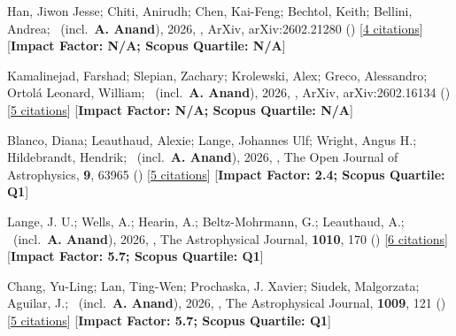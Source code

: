 \item[{\color{numcolor}\scriptsize34}] Han, Jiwon Jesse; Chiti, Anirudh; Chen, Kai-Feng; Bechtol, Keith; Bellini, Andrea; \etal\ (incl.\ \textbf{A. Anand}), 2026, , ArXiv, arXiv:2602.21280 () [\href{https://ui.adsabs.harvard.edu/abs/2026arXiv260221280H}{4 citations}] [\textbf{Impact Factor: N/A; Scopus Quartile: N/A}]

\item[{\color{numcolor}\scriptsize33}] Kamalinejad, Farshad; Slepian, Zachary; Krolewski, Alex; Greco, Alessandro; Ortol{\'a} Leonard, William; \etal\ (incl.\ \textbf{A. Anand}), 2026, , ArXiv, arXiv:2602.16134 () [\href{https://ui.adsabs.harvard.edu/abs/2026arXiv260216134K}{5 citations}] [\textbf{Impact Factor: N/A; Scopus Quartile: N/A}]

\item[{\color{numcolor}\scriptsize32}] Blanco, Diana; Leauthaud, Alexie; Lange, Johannes Ulf; Wright, Angus H.; Hildebrandt, Hendrik; \etal\ (incl.\ \textbf{A. Anand}), 2026, , The Open Journal of Astrophysics, \textbf{9}, 63965 () [\href{https://ui.adsabs.harvard.edu/abs/2026OJAp....963965B}{5 citations}] [\textbf{Impact Factor: 2.4; Scopus Quartile: Q1}]

\item[{\color{numcolor}\scriptsize31}] Lange, J. U.; Wells, A.; Hearin, A.; Beltz-Mohrmann, G.; Leauthaud, A.; \etal\ (incl.\ \textbf{A. Anand}), 2026, , The Astrophysical Journal, \textbf{1010}, 170 () [\href{https://ui.adsabs.harvard.edu/abs/2026ApJ..1010..170L}{6 citations}] [\textbf{Impact Factor: 5.7; Scopus Quartile: Q1}]

\item[{\color{numcolor}\scriptsize30}] Chang, Yu-Ling; Lan, Ting-Wen; Prochaska, J. Xavier; Siudek, Malgorzata; Aguilar, J.; \etal\ (incl.\ \textbf{A. Anand}), 2026, , The Astrophysical Journal, \textbf{1009}, 121 () [\href{https://ui.adsabs.harvard.edu/abs/2026ApJ..1009..121C}{5 citations}] [\textbf{Impact Factor: 5.7; Scopus Quartile: Q1}]

